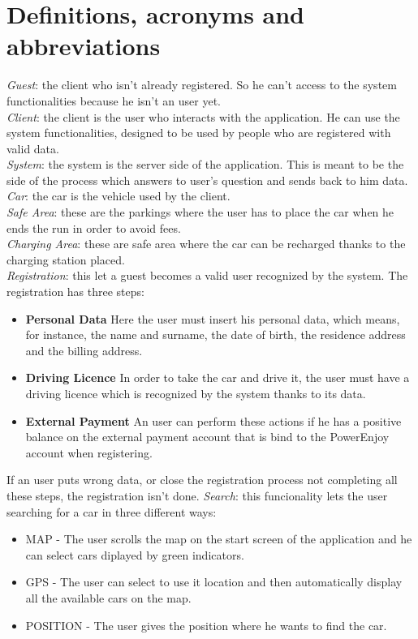 \documentclass[11pt,a4paper]{report}
\begin{document}
\section{Definitions, acronyms and abbreviations}
\textit{Guest}: the client who isn't already registered. So he can't access to the system functionalities because he isn't an user yet.\\
\textit{Client}: the client is the user who interacts with the application. He can use the system functionalities, designed to be used by people who are registered with valid data.\\
\textit{System}: the system is the server side of the application. This is meant to be the side of the process which answers to user's question and sends back to him data.\\
\textit{Car}: the car is the vehicle used by the client.\\
\textit{Safe Area}: these are the parkings where the user has to place the car when he ends the run in order to avoid fees.\\
\textit{Charging Area}: these are safe area where the car can be recharged thanks to the charging station placed. \\
\textit{Registration}: this let a guest becomes a valid user recognized by the system. The registration has three steps:
	\begin{itemize}
		\item \textbf{Personal Data} Here the user must insert his personal data, which means, for instance, the name and surname, the date of birth, the residence address and the billing address.
		\item \textbf{Driving Licence} In order to take the car and drive it, the user must have a driving licence which is recognized by the system thanks to its data.
		\item \textbf{External Payment} An user can perform these actions if he has a positive balance on the external payment account that is bind to the PowerEnjoy account when registering.
	\end{itemize}	
If an user puts wrong data, or close the registration process not completing all these steps, the registration isn't done.
\textit{Search}: this funcionality lets the user searching for a car in three different ways:
	\begin{itemize}
		\item MAP - The user scrolls the map on the start screen of the application and he can select cars diplayed by green indicators.
		\item GPS - The user can select to use it location and then automatically display all the available cars on the map.
		\item POSITION - The user gives the position where he wants to find the car.
	\end{itemize}
\end{document}
